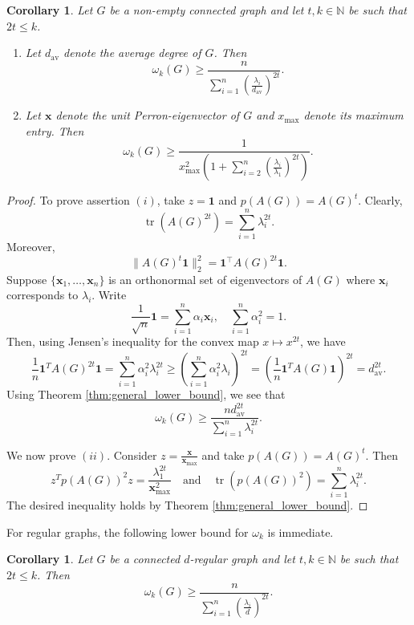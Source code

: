 \documentclass[11pt]{article}
\theoremstyle{plain}
\newtheorem{corollary}[theorem]{Corollary}
\numberwithin{equation}{section}
\DeclareMathOperator{\tr}{tr}
\newcommand{\av}[1]{{#1}_{\text{av}}}
\begin{document}
\begin{corollary}
Let $G$ be a non-empty connected graph and let $t, k \in \mathbb{N}$ be such that $2t \leq k$.
\begin{enumerate}[$(i)$]
    \item Let $\av d$ denote the average degree of $G$. Then 
    \[ \omega_k(G) \geq \frac{n}{\sum_{i = 1}^n \left(\frac{\lambda_i}{\av d}\right)^{2t}}.\]
    \item Let $\mathbf{x}$ denote the unit Perron-eigenvector of $G$ and $x_{\max}$ denote its maximum entry. Then
       \[\omega_k(G) \ge \frac{1}{x_{\max}^{2}\left(1 + \sum_{i=2}^n\left(\frac{\lambda_i}{\lambda_1}\right)^{2t}\right)}.\]
\end{enumerate}
\end{corollary}

\begin{proof} To prove assertion $(i)$, take $z = \mathbf{1}$ and $p(A(G)) = A(G)^t$. Clearly, 
\[ \tr(A(G)^{2t}) = \sum_{i=1}^n \lambda_i^{2t}.\]
Moreover, 
\[ \| A(G)^t \mathbf{1}\|_2^2 = \mathbf{1}^\top A(G)^{2t}\mathbf{1}.\]
Suppose $\{\mathbf{x}_1, \ldots, \mathbf{x}_n\}$ is an orthonormal set of eigenvectors of $A(G)$ where $\mathbf{x}_i$ corresponds to $\lambda_i$. Write 
\[\frac{1}{\sqrt{n}}\mathbf{1} = \sum_{i=1}^n \alpha_i \mathbf{x}_i, \quad \sum_{i=1}^n \alpha_i^2 = 1.\]
Then, using Jensen's inequality for the convex map $x \mapsto x^{2t}$, we have 
\[\frac{1}{n} \mathbf{1}^T A(G)^{2t}\mathbf{1} = \sum_{i=1}^n \alpha_i^2 \lambda_i^{2t}\ge \left(\sum_{i=1}^n \alpha_i^2 \lambda_i\right)^{2t} = \left(\frac{1}{n}\mathbf{1}^T A(G)\mathbf{1}\right)^{2t} = \av d^{2t}.\]  
Using Theorem \ref{thm:general_lower_bound}, we see that 
\[ \omega_k(G)\ge \frac{n \av d^{2t}}{\sum_{i=1}^n \lambda_i^{2t}}.\]

We now prove $(ii)$. Consider $z = \frac{\mathbf{x}}{\mathbf{x}_{\max}}$ and take $p(A(G)) = A(G)^{t}$. Then  
\[ z^Tp(A(G))^2z = \frac{\lambda_1^{2t}}{\mathbf{x}_{\max}^2}\quad \text{and}\quad  \tr(p(A(G))^2) = \sum_{i=1}^n \lambda_i^{2t}.\]
The desired inequality holds by Theorem \ref{thm:general_lower_bound}. 
\end{proof}

For regular graphs, the following lower bound for $\omega_k$ is immediate.
 
\begin{corollary}\label{cor:regular_lb}
    Let $G$ be a connected $d$-regular graph and let $t, k \in \mathbb{N}$ be such that $2t \leq k$. Then 
        \[ \omega_k(G) \geq \frac{n}{\sum_{i = 1}^n \left(\frac{\lambda_i}{d}\right)^{2t}}.\]
\end{corollary}
\end{document}
